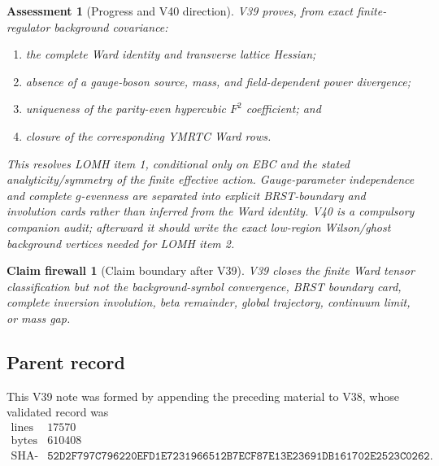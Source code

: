 \documentclass[11pt,oneside]{book}
\newtheorem{assessment}[theorem]{Assessment}
\newtheorem{firewall}[theorem]{Claim firewall}
\theoremstyle{definition}
\theoremstyle{remark}
\begin{document}
\begin{assessment}[Progress and V40 direction]
\label{ass:e8v39-status}
V39 proves, from exact finite-regulator background covariance:
\begin{enumerate}
\item the complete Ward identity and transverse lattice Hessian;
\item absence of a gauge-boson source, mass, and field-dependent
      power divergence;
\item uniqueness of the parity-even hypercubic \(F^2\) coefficient;
      and
\item closure of the corresponding YMRTC Ward rows.
\end{enumerate}
This resolves LOMH item 1, conditional only on EBC and the stated
analyticity/symmetry of the finite effective action.  Gauge-parameter
independence and complete \(g\)-evenness are separated into explicit
BRST-boundary and involution cards rather than inferred from the
Ward identity.  V40 is a compulsory companion audit; afterward it
should write the exact low-region Wilson/ghost background vertices
needed for LOMH item 2.
\end{assessment}

\begin{firewall}[Claim boundary after V39]
\label{fire:e8v39-claim}
V39 closes the finite Ward tensor classification but not the
background-symbol convergence, BRST boundary card, complete
inversion involution, beta remainder, global trajectory, continuum
limit, or mass gap.
\end{firewall}

\subsection{Parent record}

This V39 note was formed by appending the preceding material to V38,
whose validated record was
\[
\begin{array}{c|c}
\text{lines}&17570\\
\text{bytes}&610408\\
\text{SHA-256}&
\texttt{52D2F797C796220EFD1E7231966512B7ECF87E13E23691DB161702E2523C0262}.
\end{array}
\]

\end{document}
